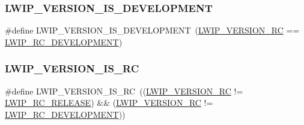 \subsubsection{\texorpdfstring{L\+W\+I\+P\+\_\+\+V\+E\+R\+S\+I\+O\+N\+\_\+\+I\+S\+\_\+\+D\+E\+V\+E\+L\+O\+P\+M\+E\+NT}{LWIP\_VERSION\_IS\_DEVELOPMENT}\hspace{0.1cm}{\footnotesize\ttfamily [2/2]}}
{\footnotesize\ttfamily \#define L\+W\+I\+P\+\_\+\+V\+E\+R\+S\+I\+O\+N\+\_\+\+I\+S\+\_\+\+D\+E\+V\+E\+L\+O\+P\+M\+E\+NT~(\hyperlink{group__lwip__version_gac1dc92d8f453a98560de7e2e00a221a1}{L\+W\+I\+P\+\_\+\+V\+E\+R\+S\+I\+O\+N\+\_\+\+RC} == \hyperlink{group__lwip__version_ga9ca69b1a453eb72efd0bbda333f2a33b}{L\+W\+I\+P\+\_\+\+R\+C\+\_\+\+D\+E\+V\+E\+L\+O\+P\+M\+E\+NT})}

\mbox{\label{group__lwip__version_ga286a5221bb18242db9071479d8125b38}} 
\subsubsection{\texorpdfstring{L\+W\+I\+P\+\_\+\+V\+E\+R\+S\+I\+O\+N\+\_\+\+I\+S\+\_\+\+RC}{LWIP\_VERSION\_IS\_RC}\hspace{0.1cm}{\footnotesize\ttfamily [1/2]}}
{\footnotesize\ttfamily \#define L\+W\+I\+P\+\_\+\+V\+E\+R\+S\+I\+O\+N\+\_\+\+I\+S\+\_\+\+RC~((\hyperlink{group__lwip__version_gac1dc92d8f453a98560de7e2e00a221a1}{L\+W\+I\+P\+\_\+\+V\+E\+R\+S\+I\+O\+N\+\_\+\+RC} != \hyperlink{group__lwip__version_ga375ee868e76ed7c458cdf249387bd469}{L\+W\+I\+P\+\_\+\+R\+C\+\_\+\+R\+E\+L\+E\+A\+SE}) \&\& (\hyperlink{group__lwip__version_gac1dc92d8f453a98560de7e2e00a221a1}{L\+W\+I\+P\+\_\+\+V\+E\+R\+S\+I\+O\+N\+\_\+\+RC} != \hyperlink{group__lwip__version_ga9ca69b1a453eb72efd0bbda333f2a33b}{L\+W\+I\+P\+\_\+\+R\+C\+\_\+\+D\+E\+V\+E\+L\+O\+P\+M\+E\+NT}))}

\mbox{\label{group__lwip__version_ga286a5221bb18242db9071479d8125b38}} 
